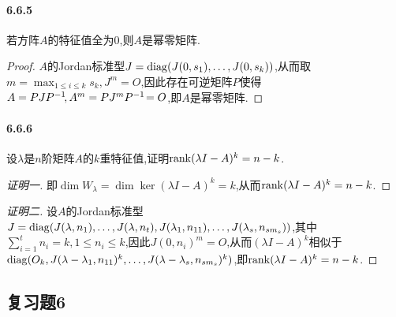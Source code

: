 \documentclass[11pt]{article}
\begin{document}
\paragraph{6.6.5}若方阵$A$的特征值全为0,则$A$是幂零矩阵.
\begin{proof}
    $A$的Jordan标准型$J=\operatorname{diag}(J(0,s_1),\dots,J(0,s_k))$,从而取$m=\max_{1\leq i\leq k}s_k, J^m=O$,因此存在可逆矩阵$P$使得$A=PJP^{-1}\!, A^m=PJ^mP^{-1}\!=O$,即$A$是幂零矩阵.
\end{proof}
\paragraph{6.6.6}设$\lambda$是$n$阶矩阵$A$的$k$重特征值,证明$\operatorname{rank}(\lambda I-A)^k=n-k$.
\begin{proof}[证明一]
    即$\dim W_{\lambda}=\dim\ker(\lambda I-A)^k=k$,从而$\operatorname{rank}(\lambda I-A)^k=n-k$.
\end{proof}
\begin{proof}[证明二]
    设$A$的Jordan标准型$J=\operatorname{diag}(J(\lambda,n_1),\dots,J(\lambda,n_t),J(\lambda_1,n_{11}),\dots,J(\lambda_s,n_{sm_s}))$,其中$\sum_{i=1}^t n_i=k, 1\leq n_i\leq k$,因此$J(0,n_i)^m=O$,从而$(\lambda I-A)^k$相似于$\operatorname{diag}(O_k,J(\lambda-\lambda_1,n_{11})^k,\dots,J(\lambda-\lambda_s,n_{sm_s})^k)$,即$\operatorname{rank} (\lambda I-A)^k=n-k$.
\end{proof}

\subsection*{复习题6}
\end{document}
